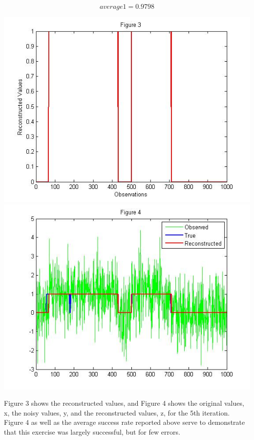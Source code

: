 \documentclass[12pt]{article} %
\begin{document}
\begin{equation*}
average1 = 0.9798
\end{equation*}

\begin{center}
\includegraphics[scale = .35]{figure3}
\includegraphics[scale = .35]{figure4}
\end{center}

Figure 3 shows the reconstructed values, and Figure 4 shows the original values, x, the noisy values, y, and the reconstructed values, z, for the 5th iteration. Figure 4 as well as the average success rate reported above serve to demonstrate that this exercise was largely successful, but for few errors.
\end{document}
